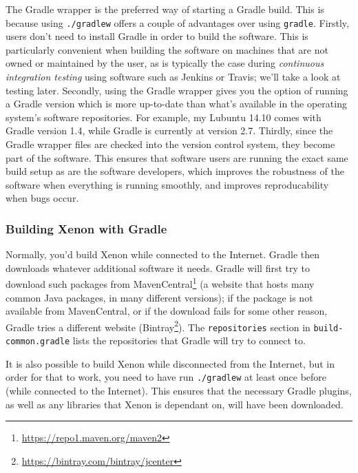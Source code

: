 \documentclass[12pt, a4paper, twoside,openany,titlepage]{article}
\begin{document}
The Gradle wrapper is the preferred way of starting a Gradle build. This is because using \texttt{./gradlew} offers a couple of advantages over using \texttt{gradle}.
%
Firstly, users don't need to install Gradle in order to build the software. This is particularly convenient when  building the software on machines that are not owned or maintained by the user, as is typically the case during \textit{continuous integration testing} using software such as Jenkins or Travis; we'll take a look at testing later.
%
Secondly, using the Gradle wrapper gives you the option of running a Gradle version which is more up-to-date than what's available in the operating system's software repositories. For example, my Lubuntu 14.10 comes with Gradle version 1.4, while Gradle is currently at version 2.7.
%
Thirdly, since the Gradle wrapper files are checked into the version control system, they become part of the software. This ensures that software users are running the exact same build setup as are the software developers, which improves the robustness of the software when everything is running smoothly, and improves reproducability when bugs occur.


\subsubsection{Building Xenon with Gradle}

Normally, you'd build Xenon while connected to the Internet. Gradle then downloads whatever additional software it needs. Gradle will first try to download such packages from MavenCentral\footnote{\url{https://repo1.maven.org/maven2}} (a website that hosts many common Java packages, in many different versions); if the package is not available from MavenCentral, or if the download fails for some other reason, Gradle tries a different website (Bintray\footnote{\url{https://bintray.com/bintray/jcenter}}). The \texttt{repositories} section in \texttt{build-common.gradle} lists the repositories that Gradle will try to connect to.

It is also possible to build Xenon while disconnected from the Internet, but in order for that to work, you need to have run \texttt{./gradlew} at least once before (while connected to the Internet). This ensures that the necessary Gradle plugins, as well as any libraries that Xenon is dependant on, will have been downloaded.
\end{document}

